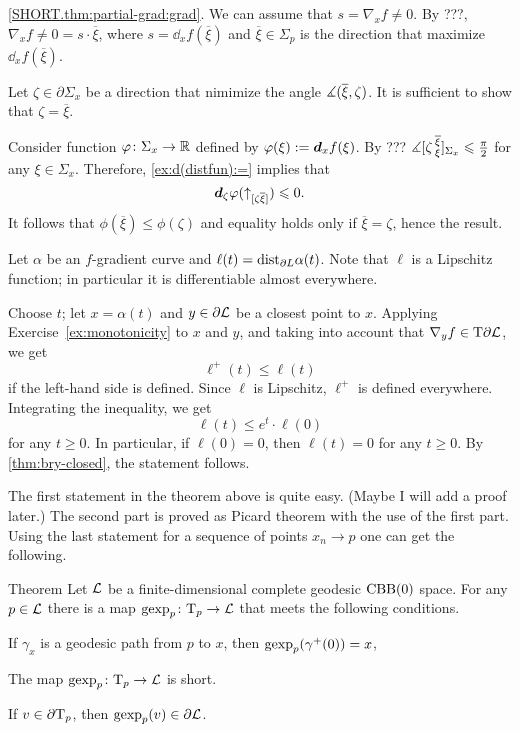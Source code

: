  \ref{SHORT.thm:partial-grad:grad}.
We can assume that $s=\nabla_xf\ne 0$.
By ???, $\nabla_xf\ne 0=s\cdot \overline{\xi}$, where $s=\dd_xf(\overline{\xi})$ and $\overline{\xi}\in\Sigma_p$ is the direction that maximize $\dd_xf(\overline{\xi})$.

Let $\zeta\in \partial\Sigma_x$ be a direction that nimimize the angle $\measuredangle(\overline{\xi},\zeta)$.
It is sufficient to show that $\zeta=\overline{\xi}$.
 
Consider function $\varphi\colon\Sigma_x\to\mathbb{R}$ defined by $\varphi(\xi)\mathrel{:=}\bm{d}_xf(\xi)$.
By ??? $\measuredangle [\zeta\,{}^{\overline{\xi}}_{\xi}]_{\Sigma_x}\leqslant \tfrac\pi 2$ for any $\xi\in\Sigma_x$.
Therefore, \ref{ex:d(distfun):=} implies that 
\[\bm{d}_\zeta\varphi({\uparrow}_{[{\zeta}{\overline{\xi}}]})\leqslant 0.\]
It follows that $\phi(\overline{\xi})\le \phi(\zeta)$ and equality holds only if $\overline{\xi}=\zeta$,
hence the result.

Let $\alpha$ be an $f$-gradient curve and $\ell(t)=\mathrm{dist}_{\partial L}\alpha(t)$.
Note that $\ell$ is a Lipschitz function;
in particular it is differentiable almost everywhere.

Choose $t$;
let $x=\alpha(t)$ and $y\in \partial\mathcal{L}$ be a closest point to $x$.
Applying Exercise~\ref{ex:monotonicity} to $x$ and $y$, 
and taking into account that $\nabla_yf\in \mathrm{T}\partial\mathcal{L}$, 
we get
\[\ell^+(t)\le \ell(t)\]
if the left-hand side is defined.
Since $\ell$ is Lipschitz, $\ell^+$ is defined everywhere.
Integrating the inequality, we get 
\[\ell(t)\le e^t\cdot\ell(0)\]
for any $t\ge 0$.
In particular, if $\ell(0)=0$, then $\ell(t)=0$ for any $t\ge 0$.
By \ref{thm:bry-closed}, the statement follows.
\qeds

The first statement in the theorem above is quite easy.
(Maybe I will add a proof later.)
The second part is proved as Picard theorem with the use of the first part.
Using the last statement for a sequence of points $x_n\to p$ one can get the following.

\begin{thm}{Theorem}\label{thm:gexp}
Let $\mathcal{L}$ be a finite-dimensional complete geodesic $\mathrm{CBB}(0)$ space.
For any $p\in \mathcal{L}$ there is a map $\operatorname{\rm gexp}\nolimits_p\colon\mathrm{T}_p\to \mathcal{L}$  that meets the following conditions.

\begin{subthm}{}
If $\gamma_x$ is a geodesic path from $p$ to $x$, then $\operatorname{\rm gexp}\nolimits_p(\gamma^+(0))=x$, 
\end{subthm}

\begin{subthm}{}
The map $\operatorname{\rm gexp}\nolimits_p\colon\mathrm{T}_p\to \mathcal{L}$ is short.
\end{subthm}

\begin{subthm}{}
If $v\in \partial\mathrm{T}_p$, then $\operatorname{\rm gexp}\nolimits_p(v)\in \partial  \mathcal{L}$.
\end{subthm}

\end{thm}

